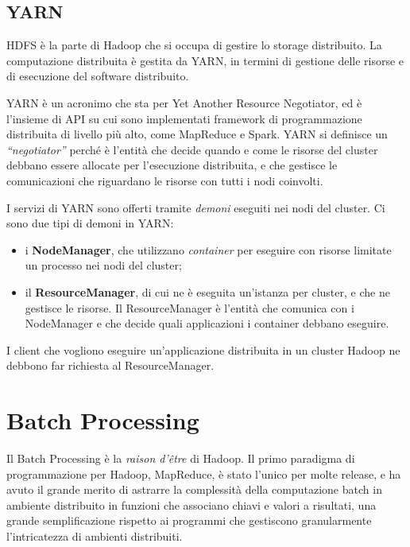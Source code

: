 \documentclass[italian,a4paper, twoside, 12pt]{report}
\begin{document}
\section{YARN}\label{yarn}

HDFS è la parte di Hadoop che si occupa di gestire lo storage
distribuito. La computazione distribuita è gestita da YARN, in termini
di gestione delle risorse e di esecuzione del software distribuito.

YARN è un acronimo che sta per Yet Another Resource Negotiator, ed è
l'insieme di API su cui sono implementati framework di programmazione
distribuita di livello più alto, come MapReduce e Spark. YARN si
definisce un \emph{``negotiator''} perché è l'entità che decide quando e
come le risorse del cluster debbano essere allocate per l'esecuzione
distribuita, e che gestisce le comunicazioni che riguardano le risorse
con tutti i nodi coinvolti.

I servizi di YARN sono offerti tramite \emph{demoni} eseguiti nei nodi
del cluster. Ci sono due tipi di demoni in YARN:

\begin{itemize}
\item
  i \textbf{NodeManager}, che utilizzano \emph{container} per eseguire
  con risorse limitate un processo nei nodi del cluster;
\item
  il \textbf{ResourceManager}, di cui ne è eseguita un'istanza per
  cluster, e che ne gestisce le risorse. Il ResourceManager è l'entità
  che comunica con i NodeManager e che decide quali applicazioni i
  container debbano eseguire.
\end{itemize}

I client che vogliono eseguire un'applicazione distribuita in un cluster
Hadoop ne debbono far richiesta al ResourceManager.

\chapter{Batch Processing}\label{batch-processing}

Il Batch Processing è la \emph{raison d'être} di Hadoop. Il primo
paradigma di programmazione per Hadoop, MapReduce, è stato l'unico per
molte release, e ha avuto il grande merito di astrarre la complessità
della computazione batch in ambiente distribuito in funzioni che
associano chiavi e valori a risultati, una grande semplificazione
rispetto ai programmi che gestiscono granularmente l'intricatezza di
ambienti distribuiti.
\end{document}
